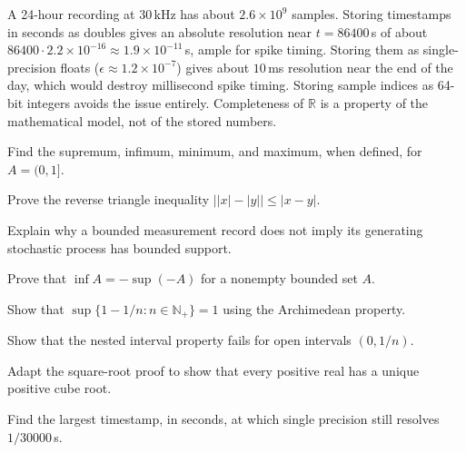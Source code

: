\begin{workedexample}
A 24-hour recording at 30\,kHz has about $2.6\times10^9$ samples. Storing timestamps in seconds as doubles gives an absolute resolution near $t=86400$\,s of about $86400\cdot2.2\times10^{-16}\approx1.9\times10^{-11}$\,s, ample for spike timing. Storing them as single-precision floats ($\epsilon\approx1.2\times10^{-7}$) gives about $10$\,ms resolution near the end of the day, which would destroy millisecond spike timing. Storing sample indices as 64-bit integers avoids the issue entirely. Completeness of $\mathbb R$ is a property of the mathematical model, not of the stored numbers.
\end{workedexample}
\begin{exercises}
\item Find the supremum, infimum, minimum, and maximum, when defined, for $A=(0,1]$.
\item Prove the reverse triangle inequality $\big||x|-|y|\big|\le |x-y|$.
\item Explain why a bounded measurement record does not imply its generating stochastic process has bounded support.
\item Prove that $\inf A=-\sup(-A)$ for a nonempty bounded set $A$.
\item Show that $\sup\{1-1/n:n\in\mathbb N_+\}=1$ using the Archimedean property.
\item Show that the nested interval property fails for open intervals $(0,1/n)$.
\item Adapt the square-root proof to show that every positive real has a unique positive cube root.
\item Find the largest timestamp, in seconds, at which single precision still resolves $1/30000$\,s.
\end{exercises}
